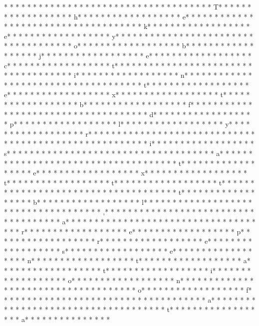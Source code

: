 * * *  * * *  * * *  *  * * *  *  * * *  * 	* * *  * * *  * * *  *  * * *  *  * * *  * T* * *  * * *  * * *  *  * * *  *  * * *  * h* * *  * * *  * * *  *  * * *  *  * * *  * e* * *  * * *  * * *  *  * * *  *  * * *  *  * * *  * * *  * * *  *  * * *  *  * * *  * k* * *  * * *  * * *  *  * * *  *  * * *  * e* * *  * * *  * * *  *  * * *  *  * * *  * y* * *  * * *  * * *  *  * * *  *  * * *  *  * * *  * * *  * * *  *  * * *  *  * * *  * o* * *  * * *  * * *  *  * * *  *  * * *  * b* * *  * * *  * * *  *  * * *  *  * * *  * j* * *  * * *  * * *  *  * * *  *  * * *  * e* * *  * * *  * * *  *  * * *  *  * * *  * c* * *  * * *  * * *  *  * * *  *  * * *  * t* * *  * * *  * * *  *  * * *  *  * * *  *  * * *  * * *  * * *  *  * * *  *  * * *  * i* * *  * * *  * * *  *  * * *  *  * * *  * n* * *  * * *  * * *  *  * * *  *  * * *  *  * * *  * * *  * * *  *  * * *  *  * * *  * t* * *  * * *  * * *  *  * * *  *  * * *  * e* * *  * * *  * * *  *  * * *  *  * * *  * x* * *  * * *  * * *  *  * * *  *  * * *  * t* * *  * * *  * * *  *  * * *  *  * * *  * b* * *  * * *  * * *  *  * * *  *  * * *  * f* * *  * * *  * * *  *  * * *  *  * * *  * {* * *  * * *  * * *  *  * * *  *  * * *  * d* * *  * * *  * * *  *  * * *  *  * * *  * p* * *  * * *  * * *  *  * * *  *  * * *  * l* * *  * * *  * * *  *  * * *  *  * * *  * y* * *  * * *  * * *  *  * * *  *  * * *  * r* * *  * * *  * * *  *  * * *  *  * * *  * }* * *  * * *  * * *  *  * * *  *  * * *  *  * * *  * * *  * * *  *  * * *  *  * * *  * i* * *  * * *  * * *  *  * * *  *  * * *  * s* * *  * * *  * * *  *  * * *  *  * * *  *  * * *  * * *  * * *  *  * * *  *  * * *  * a* * *  * * *  * * *  *  * * *  *  * * *  *  * * *  * * *  * * *  *  * * *  *  * * *  * t* * *  * * *  * * *  *  * * *  *  * * *  * e* * *  * * *  * * *  *  * * *  *  * * *  * x* * *  * * *  * * *  *  * * *  *  * * *  * t* * *  * * *  * * *  *  * * *  *  * * *  * t* * *  * * *  * * *  *  * * *  *  * * *  * t* * *  * * *  * * *  *  * * *  *  * * *  * {* * *  * * *  * * *  *  * * *  *  * * *  * t* * *  * * *  * * *  *  * * *  *  * * *  * b* * *  * * *  * * *  *  * * *  *  * * *  * l* * *  * * *  * * *  *  * * *  *  * * *  * }* * *  * * *  * * *  *  * * *  *  * * *  * ,* * *  * * *  * * *  *  * * *  *  * * *  *  * * *  * * *  * * *  *  * * *  *  * * *  * a* * *  * * *  * * *  *  * * *  *  * * *  *  * * *  * * *  * * *  *  * * *  *  * * *  * r* * *  * * *  * * *  *  * * *  *  * * *  * e* * *  * * *  * * *  *  * * *  *  * * *  * p* * *  * * *  * * *  *  * * *  *  * * *  * r* * *  * * *  * * *  *  * * *  *  * * *  * e* * *  * * *  * * *  *  * * *  *  * * *  * s* * *  * * *  * * *  *  * * *  *  * * *  * e* * *  * * *  * * *  *  * * *  *  * * *  * n* * *  * * *  * * *  *  * * *  *  * * *  * t* * *  * * *  * * *  *  * * *  *  * * *  * a* * *  * * *  * * *  *  * * *  *  * * *  * t* * *  * * *  * * *  *  * * *  *  * * *  * i* * *  * * *  * * *  *  * * *  *  * * *  * o* * *  * * *  * * *  *  * * *  *  * * *  * n* * *  * * *  * * *  *  * * *  *  * * *  *  * * *  * * *  * * *  *  * * *  *  * * *  * o* * *  * * *  * * *  *  * * *  *  * * *  * f* * *  * * *  * * *  *  * * *  *  * * *  *  * * *  * * *  * * *  *  * * *  *  * * *  * a* * *  * * *  * * *  *  * * *  *  * * *  *  * * *  * * *  * * *  *  * * *  *  * * *  * t* * *  * * *  * * *  *  * * *  *  * * *  * a* * *  * * *  * * *  *  * * *  *  * 
